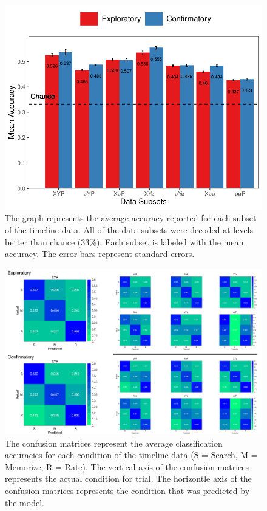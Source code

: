 \documentclass[
  english,
  man,floatsintext]{apa6}
\begin{document}
\begin{figure}
\centering
\includegraphics{results/r_code/timeline_subset_chance.pdf}
\caption{\label{fig:timeline-parcellation-chance}The graph represents the average accuracy reported for each subset of the timeline data. All of the data subsets were decoded at levels better than chance (33\%). Each subset is labeled with the mean accuracy. The error bars represent standard errors.}
\end{figure}

\begin{figure}
\centering
\includegraphics{figures/timeline_conf_matrices.pdf}
\caption{\label{fig:timeline-conf-matrices}The confusion matrices represent the average classification accuracies for each condition of the timeline data (S = Search, M = Memorize, R = Rate). The vertical axis of the confusion matrices represents the actual condition for trial. The horizontle axis of the confusion matrices represents the condition that was predicted by the model.}
\end{figure}
\end{document}
